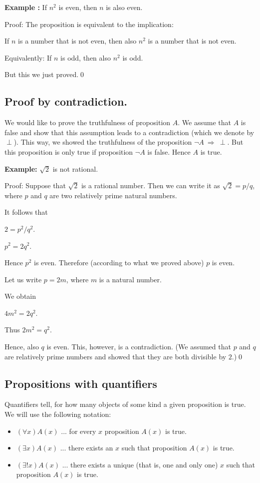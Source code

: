 \documentclass[11pt,paper=b5,footinclude,headinclude]{scrbook} %
\def\sledi {{~\Rightarrow~}}
\theoremstyle{remark}
\theoremstyle{definition} %
\theoremstyle{theorem} %
\begin{document}
\medskip
\textbf{ Example :} If  $n^2$ is even, then $n$ is also even.

Proof: The proposition is equivalent to the implication:

If $n$ is a number that is not even, then also $n^2$ is a number that is not even.

Equivalently: If $n$ is odd, then also $n^2$ is odd.

But this we just proved.\qed

\subsection{Proof by contradiction.}

We would like to prove the truthfulness of proposition $A$.
We assume that $A$ is false and show that this assumption leads to a contradiction (which we denote by $\perp$).
This way, we showed the truthfulness of the proposition $\neg A \sledi \perp$. But this proposition is only true if proposition $\neg A$ is false. Hence $A$ is true.

\medskip
\textbf{ Example:} $\sqrt 2$ is not rational.

Proof: Suppose that $\sqrt 2$ is a rational number. Then we can write it as $\sqrt 2 = p/q$, where $p$ and $q$ are
two relatively prime natural numbers.

It follows that

$2 = p^2/q^2$.

$p^2 = 2q^2$.

Hence $p^2$ is even. Therefore (according to what we proved above) $p$ is even.

Let us write $p = 2m$, where $m$ is a natural number.

We obtain

$4m^2 = 2q^2$.

Thus
$2m^2 = q^2$.

Hence, also $q$ is even. This, however, is a contradiction. (We assumed that $p$ and $q$ are relatively prime numbers and showed that they are both divisible by $2$.)\qed




\subsection{Propositions with quantifiers}
Quantifiers tell, for  how many objects of some kind a given proposition is true.
We will use the following notation:

%
%
%
\begin{itemize}
  \item
  $(\forall x) A(x)$ ... for every $x$ proposition $A(x)$ is true.
  \item
  $(\exists  x) A(x)$ ... there exists an $x$ such that proposition $A(x)$ is true.
  \item
  $(\exists!  x) A(x)$ ... there exists a unique (that is, one and only one) $x$ such that proposition $A(x)$ is true.
\end{itemize}
\end{document}
